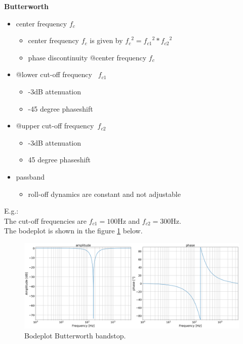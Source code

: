 
\textbf{Butterworth}
\begin{itemize}
    \item center frequency $f_c$
    \begin{itemize}
        \item center frequency $f_c$ is given by ${f_c}^2={f_{c1}}^2*{f_{c2}}^2$
		\item phase discontinuity @center frequency $f_c$
    \end{itemize}
    \item @lower cut-off frequency~ $f_{c1}$
    \begin{itemize}
        \item -3dB attenuation
        \item -45 degree phaseshift
    \end{itemize}
	\item @upper cut-off frequency~$f_{c2}$
    \begin{itemize}
        \item -3dB attenuation
        \item 45 degree phaseshift
    \end{itemize}
    \item passband 
    \begin{itemize}
		\item roll-off dynamics are constant and not adjustable
    \end{itemize} 
\end{itemize}

E.g.: \\
The cut-off frequencies are $f_{c1}=100$Hz and $f_{c2}=300$Hz.\\
The bodeplot is shown in the figure \ref{fig:bs_butter} below.
\begin{figure}[h!]
  \centering
  \includegraphics[width=.75\linewidth]{bs_butter.png}
  \caption{Bodeplot Butterworth bandstop.}
  \label{fig:bs_butter}
\end{figure}
	
